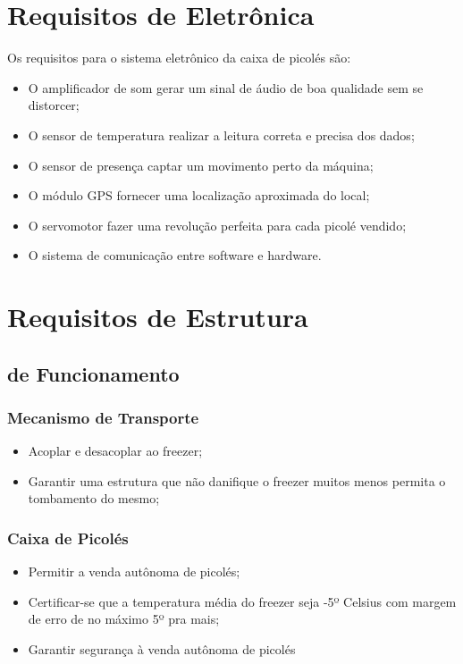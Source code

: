 \section{Requisitos de Eletrônica}

Os requisitos para o sistema eletrônico da caixa de picolés são:

\begin{itemize}
	\item O amplificador de som gerar um sinal de áudio de boa qualidade sem se distorcer;
    \item O sensor de temperatura realizar a leitura correta e precisa dos dados;
    \item O sensor de presença captar um movimento perto da máquina;
    \item O módulo GPS fornecer uma localização aproximada do local;
    \item O servomotor fazer uma revolução perfeita para cada picolé vendido;
    \item O sistema de comunicação entre software e hardware.
\end{itemize}

\section{Requisitos de Estrutura}

\subsection{de Funcionamento}

\subsubsection{Mecanismo de Transporte}
\begin{itemize}
\item Acoplar e desacoplar ao freezer;
\item Garantir uma estrutura que não danifique o freezer muitos menos permita o tombamento do mesmo;
\end{itemize}

\subsubsection{Caixa de Picolés}
\begin{itemize}
\item Permitir a venda autônoma de picolés;
\item Certificar-se que a temperatura média do freezer seja -5º Celsius com margem de erro de no máximo 5º pra mais;
\item Garantir segurança à venda autônoma de picolés
\end{itemize}

